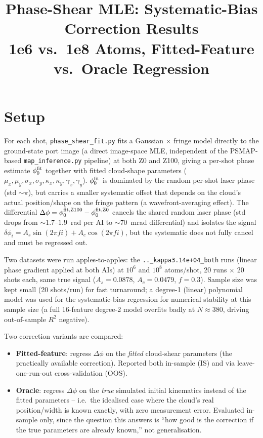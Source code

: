 \documentclass[11pt,a4paper]{article}
\title{Phase-Shear MLE: Systematic-Bias Correction Results\\
  \large 1e6 vs.\ 1e8 Atoms, Fitted-Feature vs.\ Oracle Regression}
\author{}
\date{}
\newcommand{\code}[1]{\texttt{#1}}
\begin{document}
\maketitle

\section{Setup}

For each shot, \code{phase\_shear\_fit.py} fits a Gaussian $\times$ fringe
model directly to the ground-state port image (a direct image-space MLE,
independent of the PSMAP-based \code{map\_inference.py} pipeline) at both
Z0 and Z100, giving a per-shot phase estimate $\phi_0^{\rm fit}$ together
with fitted cloud-shape parameters ($\mu_x,\mu_y,\sigma_x,\sigma_y,
\kappa_x,\kappa_y,\gamma_x,\gamma_y$). $\phi_0^{\rm fit}$ is dominated by
the random per-shot laser phase (std $\sim\pi$), but carries a smaller
systematic offset that depends on the cloud's actual position/shape on the
fringe pattern (a wavefront-averaging effect). The differential
$\Delta\phi = \phi_0^{\rm fit,Z100}-\phi_0^{\rm fit,Z0}$ cancels the shared
random laser phase (std drops from $\sim1.7$--$1.9$~rad per AI to
$\sim70$~mrad differential) and isolates the signal
$\delta\phi_i=A_s\sin(2\pi f i)+A_c\cos(2\pi f i)$, but the systematic does
not fully cancel and must be regressed out.

Two datasets were run apples-to-apples: the \code{..\_kappa3.14e+04\_both}
runs (linear phase gradient applied at both AIs) at $10^6$ and $10^8$
atoms/shot, 20 runs $\times$ 20 shots each, same true signal
($A_s=0.0878$, $A_c=0.0479$, $f=0.3$). Sample size was kept small
(20 shots/run) for fast turnaround; a degree-1 (linear) polynomial model
was used for the systematic-bias regression for numerical stability at
this sample size (a full 16-feature degree-2 model overfits badly at
$N\approx380$, driving out-of-sample $R^2$ negative).

Two correction variants are compared:
\begin{itemize}
  \item \textbf{Fitted-feature}: regress $\Delta\phi$ on the
    \emph{fitted} cloud-shear parameters (the practically available
    correction). Reported both in-sample (IS) and via leave-one-run-out
    cross-validation (OOS).
  \item \textbf{Oracle}: regress $\Delta\phi$ on the \emph{true} simulated
    initial kinematics instead of the fitted parameters -- i.e.\ the
    idealised case where the cloud's real position/width is known exactly,
    with zero measurement error. Evaluated in-sample only, since the
    question this answers is ``how good is the correction if the true
    parameters are already known,'' not generalisation.
\end{itemize}
\end{document}
